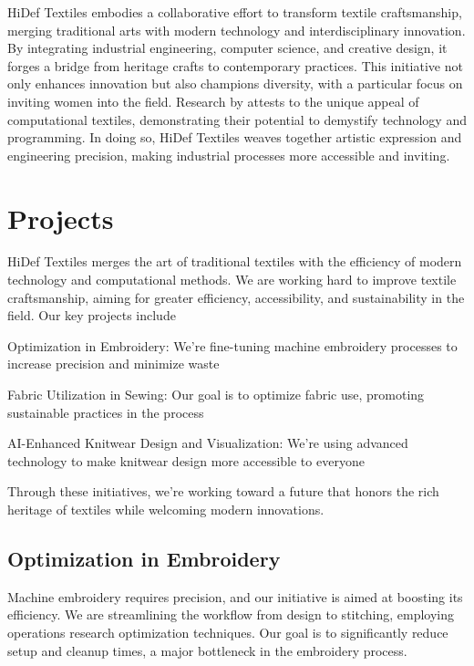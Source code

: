 \documentclass{article}
\begin{document}
    HiDef Textiles embodies a collaborative effort to transform textile craftsmanship, merging
    traditional arts with modern technology and interdisciplinary innovation. By integrating industrial
    engineering, computer science, and creative design, it forges a bridge from heritage crafts to
    contemporary practices. This initiative not only enhances innovation but also champions diversity,
    with a particular focus on inviting women into the field. Research by \citet{qiu2013,keune2022}
    attests to the unique appeal of computational textiles, demonstrating their potential to demystify
    technology and programming. In doing so, HiDef Textiles weaves together artistic expression and
    engineering precision, making industrial processes more accessible and inviting.


    \section{Projects}
    HiDef Textiles merges the art of traditional textiles with the efficiency of modern technology and
    computational methods. We are working hard to improve textile craftsmanship, aiming for greater efficiency,
    accessibility, and sustainability in the field. Our key projects include
    \begin{enumerate*}
        \item Optimization in Embroidery: We're fine-tuning machine embroidery processes to increase precision
        and minimize waste
        \item Fabric Utilization in Sewing: Our goal is to optimize fabric use, promoting sustainable practices
        in the process
        \item AI-Enhanced Knitwear Design and Visualization: We're using advanced technology to make knitwear
        design more accessible to everyone
    \end{enumerate*}
    Through these initiatives, we're working toward a future that honors the rich heritage of textiles while welcoming
    modern innovations.

    \subsection{Optimization in Embroidery}

    Machine embroidery requires precision, and our initiative is aimed at boosting its
    efficiency. We are streamlining the workflow from design to stitching, employing
    operations research optimization techniques. Our goal is to significantly reduce
    setup and cleanup times, a major bottleneck in the embroidery process.
\end{document}
